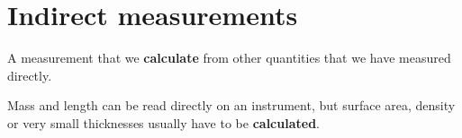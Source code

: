 
\section{Indirect measurements}

\begin{definition}
    A measurement that we \textbf{calculate} from other quantities that we have measured directly.
\end{definition}

Mass and length can be read directly on an instrument, but surface area, density or very small thicknesses usually have to be \textbf{calculated}.

%
%
%
